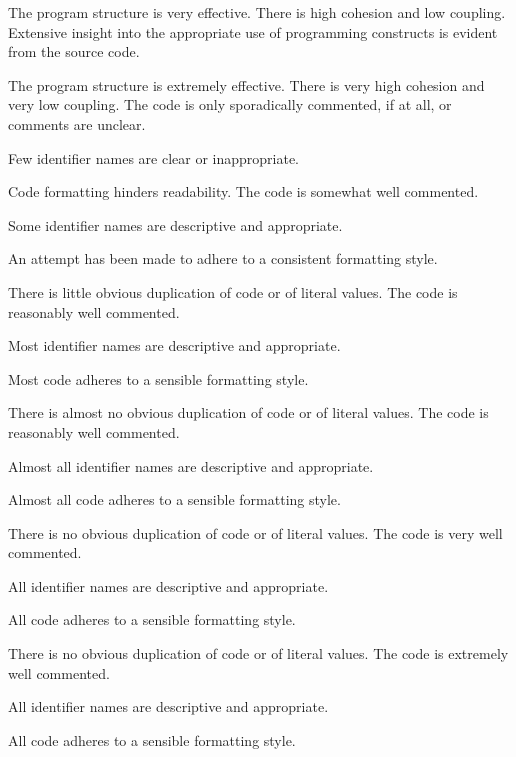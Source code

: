 \documentclass{../../fal_assignment}
\begin{document}
\begin{markingrubric}
            \par The program structure is very effective. There is high cohesion and low coupling.
        \grade Extensive insight into the appropriate use of programming constructs is evident from the source code.
            \par The program structure is extremely effective. There is very high cohesion and very low coupling.
%
        \grade \fail The code is only sporadically commented, if at all, or comments are unclear.
            \par Few identifier names are clear or inappropriate.
            \par Code formatting hinders readability.
        \grade The code is somewhat well commented.
            \par Some identifier names are descriptive and appropriate.
            \par An attempt has been made to adhere to a consistent formatting style.
             \par There is little obvious duplication of code or of literal values.           
        \grade The code is reasonably well commented.
            \par Most identifier names are descriptive and appropriate.
            \par Most code adheres to a sensible formatting style.
             \par There is almost no obvious duplication of code or of literal values.   
        \grade The code is reasonably well commented.
            \par Almost all identifier names are descriptive and appropriate.
            \par Almost all code adheres to a sensible formatting style.
             \par There is no obvious duplication of code or of literal values.
        \grade The code is very well commented.
            \par All identifier names are descriptive and appropriate.
            \par All code adheres to a sensible formatting style.
             \par There is no obvious duplication of code or of literal values.
        \grade The code is extremely well commented.
            \par All identifier names are descriptive and appropriate.
            \par All code adheres to a sensible formatting style.

\end{markingrubric}
\end{document}
